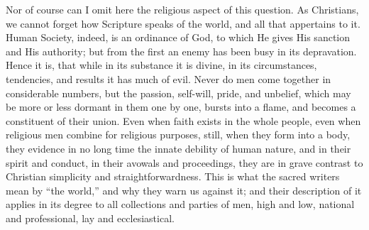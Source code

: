 Nor of course can I omit here the religious aspect of
this question. As Christians, we cannot forget how
Scripture speaks of the world, and all that appertains to
it. Human Society, indeed, is an ordinance of God, to
which He gives His sanction and His authority; but from
the first an enemy has been busy in its depravation.
Hence it is, that while in its substance it is divine, in
its circumstances, tendencies, and results it has much of
evil. Never do men come together in considerable numbers,
but the passion, self-will, pride, and unbelief, which
may be more or less dormant in them one by one, bursts
into a flame, and becomes a constituent of their union.
Even when faith exists in the whole people, even when
religious men combine for religious purposes, still, when
they form into a body, they evidence in no long time the
innate debility of human nature, and in their spirit and
conduct, in their avowals and proceedings, they are in
grave contrast to Christian simplicity and
straightforwardness. This is what the sacred writers mean
by ``the world,'' and why they warn us against
it; and their description of it applies in its degree to
all collections and parties of men, high and low,
national and professional, lay and ecclesiastical.

